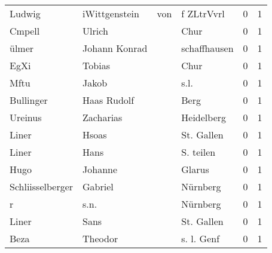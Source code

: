 \begin{tabular}{llllrr}
                   Ludwig &                      iWittgenstein &         von &                                  f ZLtrVvrl &          0 &         1 \\
                   Cmpell &                             Ulrich &             &                                        Chur &          0 &         1 \\
                    ülmer &                      Johann Konrad &             &                                schaffhausen &          0 &         1 \\
                     EgXi &                             Tobias &             &                                        Chur &          0 &         1 \\
                     Mftu &                              Jakob &             &                                        s.l. &          0 &         1 \\
                Bullinger &                        Haas Rudolf &             &                                        Berg &          0 &         1 \\
                  Ureinus &                          Zacharias &             &                                  Heidelberg &          0 &         1 \\
                    Liner &                              Hsoas &             &                                  St. Gallen &          0 &         1 \\
                    Liner &                               Hans &             &                                   S. teilen &          0 &         1 \\
                     Hugo &                            Johanne &             &                                      Glarus &          0 &         1 \\
         Schliisselberger &                            Gabriel &             &                                    Nürnberg &          0 &         1 \\
                        r &                               s.n. &             &                                    Nürnberg &          0 &         1 \\
                    Liner &                               Sans &             &                                  St. Gallen &          0 &         1 \\
                     Beza &                            Theodor &             &                                  s. l. Genf &          0 &         1 \\

\end{tabular}

